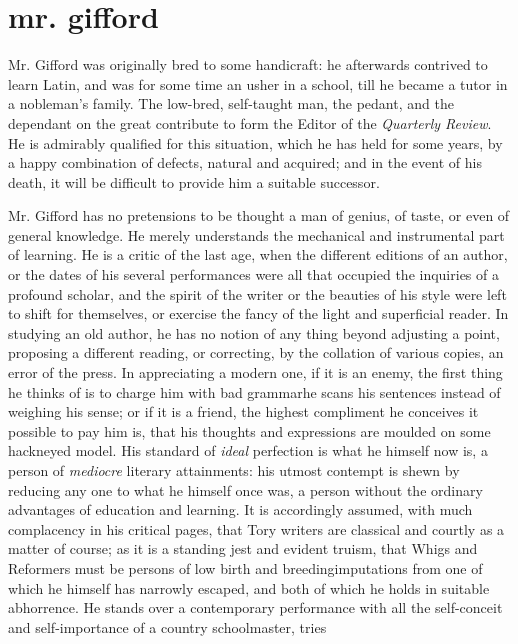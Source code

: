\chapter[Mr. Gifford]{mr. gifford}

Mr. Gifford was originally bred to some handicraft: he afterwards
contrived to learn Latin, and was for some time an usher in a
school, till he became a tutor in a nobleman's family. The
low-bred, self-taught man, the pedant, and the dependant on the
great contribute to form the Editor of the \emph{Quarterly
  Review}. He is admirably qualified for this situation, which he
has held for some years, by a happy combination of defects,
natural and acquired; and in the event of his death, it will be
difficult to provide him a suitable successor.

Mr. Gifford has no pretensions to be thought a man of genius, of
taste, or even of general knowledge. He merely understands the
mechanical and instrumental part of learning. He is a critic of
the last age, when the different editions of an author, or the
dates of his several performances were all that occupied the
inquiries of a profound scholar, and the spirit of the writer or
the beauties of his style were left to shift for themselves, or
exercise the fancy of the light and superficial reader. In
studying an old author, he has no notion of any thing beyond
adjusting a point, proposing a different reading, or correcting,
by the collation of various copies, an error of the press. In
appreciating a modern one, if it is an enemy, the first thing he
thinks of is to charge him with bad grammar\textemdash he scans
his sentences instead of weighing his sense; or if it is a friend,
the highest compliment he conceives it possible to pay him is,
that his thoughts and expressions are moulded on some hackneyed
model. His standard of \emph{ideal} perfection is what he himself
now is, a person of \emph{mediocre} literary attainments: his
utmost contempt is shewn by reducing any one to what he himself
once was, a person without the ordinary advantages of education
and learning. It is accordingly assumed, with much complacency in
his critical pages, that Tory writers are classical and courtly as
a matter of course; as it is a standing jest and evident truism,
that Whigs and Reformers must be persons of low birth and
breeding\textemdash imputations from one of which he himself has
narrowly escaped, and both of which he holds in suitable
abhorrence. He stands over a contemporary performance with all the
self-conceit and self-importance of a country schoolmaster, tries
